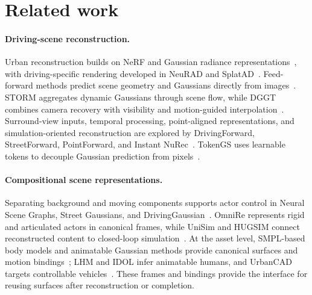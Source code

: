 \section{Related work}
\label{sec:related}

\paragraph{Driving-scene reconstruction.}
Urban reconstruction builds on NeRF and Gaussian radiance representations~\cite{mildenhall2020nerf,kerbl2023gaussians}, with driving-specific rendering developed in NeuRAD and SplatAD~\cite{tonderski2024neurad,hess2025splatad}. Feed-forward methods predict scene geometry and Gaussians directly from images~\cite{hong2024lrm,charatan2024pixelsplat,chen2024mvsplat,wang2024dust3r,wang2025vggt}. STORM aggregates dynamic Gaussians through scene flow, while DGGT combines camera recovery with visibility and motion-guided interpolation~\cite{yang2025storm,chen2025dggt}. Surround-view inputs, temporal processing, point-aligned representations, and simulation-oriented reconstruction are explored by DrivingForward, StreetForward, PointForward, and Instant NuRec~\cite{tian2025drivingforward,yu2026streetforward,chi2026pointforward,huang2026instantnurec}. TokenGS uses learnable tokens to decouple Gaussian prediction from pixels~\cite{ren2026tokengs}.

\paragraph{Compositional scene representations.}
Separating background and moving components supports actor control in Neural Scene Graphs, Street Gaussians, and DrivingGaussian~\cite{ost2021neuralgraphs,yan2024street,zhou2024drivinggaussian}. OmniRe represents rigid and articulated actors in canonical frames, while UniSim and HUGSIM connect reconstructed content to closed-loop simulation~\cite{chen2025omnire,yang2023unisim,zhou2024hugsim}. At the asset level, SMPL-based body models and animatable Gaussian methods provide canonical surfaces and motion bindings~\cite{loper2015smpl,pavlakos2019smplx,hu2024gauhuman,kocabas2024hugs,qian2024avatar}; LHM and IDOL infer animatable humans, and UrbanCAD targets controllable vehicles~\cite{qiu2025lhm,zhuang2025idol,lu2025urbancad}. These frames and bindings provide the interface for reusing surfaces after reconstruction or completion.

